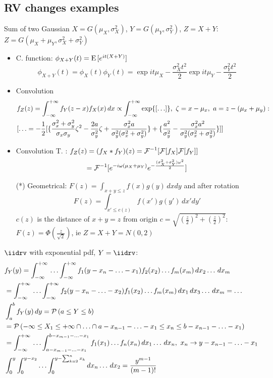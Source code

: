 \documentclass[asd-beamer.tex]{subfiles}
\begin{document}
\subsection{RV changes examples}

\begin{frame}{Sum of two Gaussian}
$X=G(\mu_X,\sigma_X^2)$, $Y=G(\mu_Y,\sigma_Y^2)$, $Z=X+Y$: $Z=G(\mu_X+\mu_Y,\sigma_X^2+\sigma_Y^2)$
\begin{itemize}
\item C. function: $\phi_{X+Y}(t)=\operatorname{E}{[e^{it(X+Y)}]}$
\[\phi_{X+Y}(t)=\phi_X(t)\phi_Y(t)=\exp{it\mu_X-\frac{\sigma_X^2t^2}{2}}\exp{it\mu_Y-\frac{\sigma_Y^2t^2}{2}}\]
\item Convolution
\begin{align*}
&f_Z(z)=\int_{-\infty}^{+\infty}{}f_Y(z-x)f_X(x)\,dx\propto\int_{-\infty}^{+\infty}{}\text{exp}\{[\ldots]\},\ \zeta=x-\mu_x,\ a=z-(\mu_x+\mu_y):\\ &[\ldots=-\frac{1}{2}[\{\frac{\sigma_x^2+\sigma_y^2}{\sigma_x\sigma_y}\zeta^2-\frac{2a}{\sigma_y^2}\zeta+\frac{\sigma_x^2a}{\sigma_y^2(\sigma_x^2+\sigma_y^2)}\}+\{\frac{a^2}{\sigma_y^2}-\frac{\sigma_x^2a^2}{\sigma_y^2(\sigma_x^2+\sigma_y^2)}\}]]
\end{align*}
\item Convolution T. : $f_Z(z)=(f_X*f_Y)(z)={\mathcal{F}{}}^{-1}[\mathcal{F}{[f_X]}\mathcal{F}{[f_Y]}]$
\[={\mathcal{F}{}}^{-1}[e^{-i\omega(\mu_X+\mu_Y)}e^{-\frac{(\sigma_X^2+\sigma_Y^2)\omega^2}{2}}]\]
\item[(*)] Geometrical: $F(z)=\int_{x+y\leq z}f(x)g(y)\,dxdy$ and after rotation
\[F(z)=\int_{x'\leq c(z)}f(x')g(y')\,dx'dy'\]
$c(z)$ is the distance of $x+y=z$ from origin $c=\sqrt{(\frac{z}{2})^2+(\frac{z}{2})^2}$: $F(z)=\Phi(\frac{z}{\sqrt{2}})$, ie $Z=X+Y=N(0,2)$
\end{itemize}
\end{frame}

\begin{wordonframe}{}
$\iidrv$ with exponential pdf, $Y=\iidrv$:
\begin{align*}
&f_Y(y)=\int_{-\infty}^{+\infty}{}\ldots\int_{-\infty}^{+\infty} f_1(y-x_n-\ldots-x_1)f_2(x_2)\ldots f_m(x_m)\,dx_2\ldots\,dx_m\\
&=\int_{-\infty}^{+\infty}{}\ldots\int_{-\infty}^{+\infty} f_2(y-x_n-\ldots-x_2)f_1(x_2)\ldots f_m(x_m)\,dx_1\,dx_3\ldots\,dx_m=\ldots\\
&\int_a^bf_Y(y)\,dy=\operatorname{\mathcal{P}}{(a\leq Y\leq b)}\\
&=\operatorname{\mathcal{P}}{(-\infty\leq X_1\leq+\infty\cap\ldots\cap a-x_{n-1}-\ldots-x_1\leq x_n\leq b-x_{n-1}-\ldots-x_1)}\\
&=\int_{-\infty}^{+\infty}{}\ldots\int_{a-x_{m-1}-\ldots-x_1}^{b-x_{m-1}-\ldots-x_1}f_1(x_1)\ldots f_n(x_n)\,dx_1\ldots\,dx_n,\ x_n\to y-x_{n-1}-\ldots-x_1\\
&\int_0^y\int_0^{y-x_2}\ldots\int_0^{y-\sum_{k=2}^nx_k}dx_n\ldots\,dx_{2}=\frac{y^{m-1}}{(m-1)!}
\end{align*}
\end{wordonframe}
\end{document}
